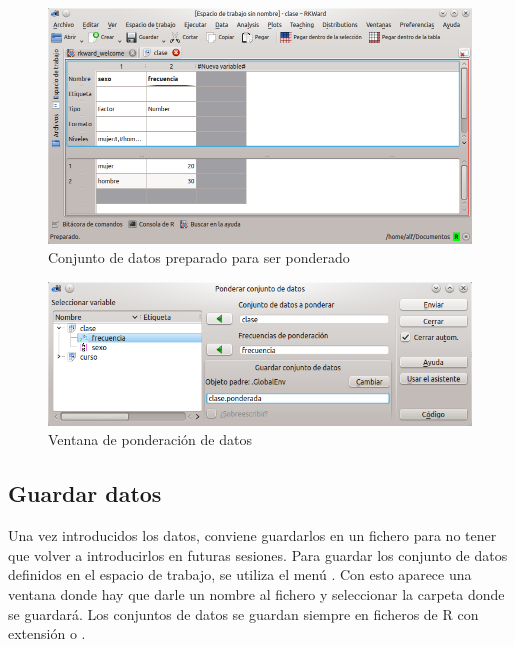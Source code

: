 \begin{figure}[htp]
\begin{center}
  \includegraphics[scale=0.6]{capitulos/introduccion/img/datos_frecuencias}
  \caption{Conjunto de datos preparado para ser ponderado}
  \label{g:ponderar_variable1}
\end{center}
\end{figure}

\begin{figure}[htp]
\begin{center}
  \includegraphics[scale=0.6]{capitulos/introduccion/img/ponderacion}
  \caption{Ventana de ponderación de datos}
  \label{g:ponderar_variable2}
\end{center}
\end{figure}


\subsection{Guardar datos}
Una vez introducidos los datos, conviene guardarlos en un fichero para no tener que volver a introducirlos en futuras
sesiones. Para guardar los conjunto de datos definidos en el espacio de trabajo, se utiliza el menú .
Con esto aparece una ventana donde hay que darle un nombre al fichero y seleccionar la carpeta donde se guardará.
Los conjuntos de datos se guardan siempre en ficheros de R con extensión  o .

